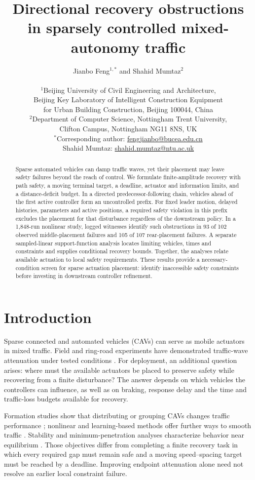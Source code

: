 \documentclass[12pt]{article}
\title{Directional recovery obstructions in sparsely controlled mixed-autonomy traffic}
\author{Jianbo Feng$^{1,*}$ and Shahid Mumtaz$^{2}$\\[0.4em]
\parbox{0.96\textwidth}{\centering\small
$^1$Beijing University of Civil Engineering and Architecture,\\
Beijing Key Laboratory of Intelligent Construction Equipment\\
for Urban Building Construction, Beijing 100044, China\\[0.25em]
$^2$Department of Computer Science, Nottingham Trent University,\\
Clifton Campus, Nottingham NG11 8NS, UK\\[0.35em]
$^*$Corresponding author: \href{mailto:fengjianbo@bucea.edu.cn}{fengjianbo@bucea.edu.cn}\\
Shahid Mumtaz: \href{mailto:shahid.mumtaz@ntu.ac.uk}{shahid.mumtaz@ntu.ac.uk}}}
\date{}
\begin{document}
\maketitle
\linenumbers

\begin{abstract}
Sparse automated vehicles can damp traffic waves, yet their placement may leave safety failures beyond the reach of control. We formulate finite-amplitude recovery with path safety, a moving terminal target, a deadline, actuator and information limits, and a distance-deficit budget. In a directed predecessor-following chain, vehicles ahead of the first active controller form an uncontrolled prefix. For fixed leader motion, delayed histories, parameters and active positions, a required safety violation in this prefix excludes the placement for that disturbance regardless of the downstream policy. In a 1,848-run nonlinear study, logged witnesses identify such obstructions in 93 of 102 observed middle-placement failures and 105 of 107 rear-placement failures. A separate sampled-linear support-function analysis locates limiting vehicles, times and constraints and supplies conditional recovery bounds. Together, the analyses relate available actuation to local safety requirements. These results provide a necessary-condition screen for sparse actuation placement: identify inaccessible safety constraints before investing in downstream controller refinement.
\end{abstract}

\section*{Introduction}
Sparse connected and automated vehicles (CAVs) can serve as mobile actuators in mixed traffic. Field and ring-road experiments have demonstrated traffic-wave attenuation under tested conditions \cite{stern2018dissipation,lee2025trafficcontrol,hayat2025explicit}. For deployment, an additional question arises: where must the available actuators be placed to preserve safety while recovering from a finite disturbance? The answer depends on which vehicles the controllers can influence, as well as on braking, response delay and the time and traffic-loss budgets available for recovery.

Formation studies show that distributing or grouping CAVs changes traffic performance \cite{li2020optimalformation,li2022cooperative}; nonlinear and learning-based methods offer further ways to smooth traffic \cite{wang2023nonlinear,sheng2024residualrl,wang2025knowledge}. Stability and minimum-penetration analyses characterize behavior near equilibrium \cite{luo2024stabilizing,bahavarnia2024howmany,bahavarnia2026lessconservative}. Those objectives differ from completing a finite recovery task in which every required gap must remain safe and a moving speed--spacing target must be reached by a deadline. Improving endpoint attenuation alone need not resolve an earlier local constraint failure.
\end{document}
